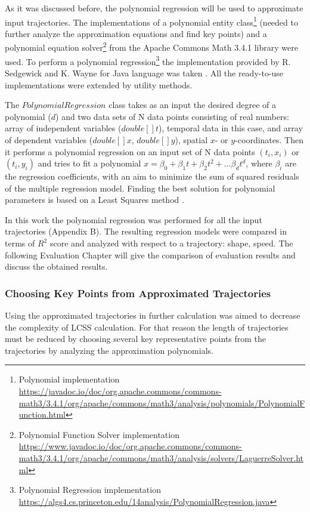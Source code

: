 As it was discussed before, the polynomial regression will be used to approximate input trajectories. The implementations of a polynomial entity class\footnote{Polynomial implementation \url{https://javadoc.io/doc/org.apache.commons/commons-math3/3.4.1/org/apache/commons/math3/analysis/polynomials/PolynomialFunction.html}} (needed to further analyze the approximation equations and find key points) and a polynomial equation solver\footnote{Polynomial Function Solver implementation \url{https://www.javadoc.io/doc/org.apache.commons/commons-math3/3.4.1/org/apache/commons/math3/analysis/solvers/LaguerreSolver.html}} from the Apache Commons Math 3.4.1 library were used. To perform a polynomial regression\footnote{Polynomial Regression implementation \url{https://algs4.cs.princeton.edu/14analysis/PolynomialRegression.java}} the implementation provided by R. Sedgewick and K. Wayne for Java language was taken \cite{online:polynomial_impl}. All the ready-to-use implementations were extended by utility methods.

The $PolynomialRegression$ class takes as an input the desired degree of a polynomial ($d$) and two data sets of N data points consisting of real numbers: array of independent variables ($double[] t$), temporal data in this case, and array of dependent variables ($double[] x$, $double[] y$), spatial $x$- or $y$-coordinates. Then it performs a polynomial regression on an input set of N data points $(t_i, x_i)$ or $(t_i, y_i)$ and tries to fit a polynomial $x = \beta_0 + \beta_1t + \beta_2t^2 + \ldots \beta_dt^d$, where $\beta_i$ are the regression coefficients, with an aim to minimize the sum of squared residuals of the multiple regression model. Finding the best solution for polynomial parameters is based on a Least Squares method \cite{article:behav_form_extr}.

In this work the polynomial regression was performed for all the input trajectories (Appendix B). The resulting regression models were compared in terms of $R^2$ score and analyzed with respect to a trajectory: shape, speed. The following Evaluation Chapter will give the comparison of evaluation results and discuss the obtained results.

\subsubsection{Choosing Key Points from Approximated Trajectories}

Using the approximated trajectories in further calculation was aimed to decrease the complexity of LCSS calculation. For that reason the length of trajectories must be reduced by choosing several key representative points from the trajectories by analyzing the approximation polynomials.

